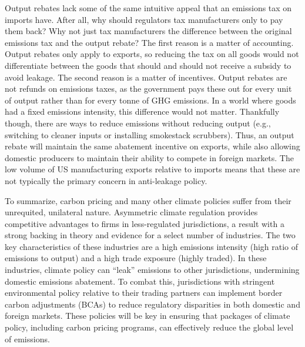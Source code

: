 Output rebates lack some of the same intuitive appeal that an emissions tax on imports have. After all, why should regulators tax manufacturers only to pay them back? Why not just tax manufacturers the difference between the original emissions tax and the output rebate? The first reason is a matter of accounting. Output rebates only apply to exports, so reducing the tax on all goods would not differentiate between the goods that should and should not receive a subsidy to avoid leakage. The second reason is a matter of incentives. Output rebates are not refunds on emissions taxes, as the government pays these out for every unit of output rather than for every tonne of GHG emissions. In a world where goods had a fixed emissions intensity, this difference would not matter. Thankfully though, there are ways to reduce emissions without reducing output (e.g., switching to cleaner inputs or installing smokestack scrubbers). Thus, an output rebate will maintain the same abatement incentive on exports, while also allowing domestic producers to maintain their ability to compete in foreign markets. The low volume of US manufacturing exports relative to imports means that these are not typically the primary concern in anti-leakage policy.

To summarize, carbon pricing and many other climate policies suffer from their unrequited, unilateral nature. Asymmetric climate regulation provides competitive advantages to firms in less-regulated jurisdictions, a result with a strong backing in theory and evidence for a select number of industries. The two key characteristics of these industries are a high emissions intensity (high ratio of emissions to output) and a high trade exposure (highly traded). In these industries, climate policy can ``leak'' emissions to other jurisdictions, undermining domestic emissions abatement. To combat this, jurisdictions with stringent environmental policy relative to their trading partners can implement border carbon adjustments (BCAs) to reduce regulatory disparities in both domestic and foreign markets. These policies will be key in ensuring that packages of climate policy, including carbon pricing programs, can effectively reduce the global level of emissions.  


